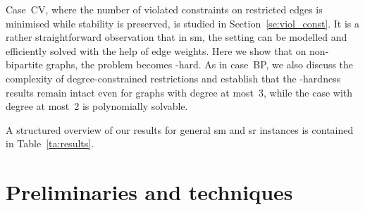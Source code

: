 \documentclass[preprint,12pt]{elsarticle}
\begin{document}
Case~CV, where the number of violated constraints on restricted edges is minimised while stability is preserved, is studied in Section~\ref{se:viol_const}. It is a rather straightforward observation that in {\sc sm}, the setting can be modelled and efficiently solved with the help of edge weights. Here we show that on non-bipartite graphs, the problem becomes -hard. As in case~BP, we also discuss the complexity of degree-constrained restrictions and establish that the -hardness results remain intact even for graphs with degree at most~3, while the case with degree at most~2 is polynomially solvable.

A structured overview of our results for general {\sc sm} and {\sc sr} instances is contained in Table~\ref{ta:results}. 
\begin{table}[ht]
	\centering
    \newline
\caption{Summary of results}
\label{ta:results}
\end{table}

\section{Preliminaries and techniques}
\label{se:preliminaries}
\end{document}
